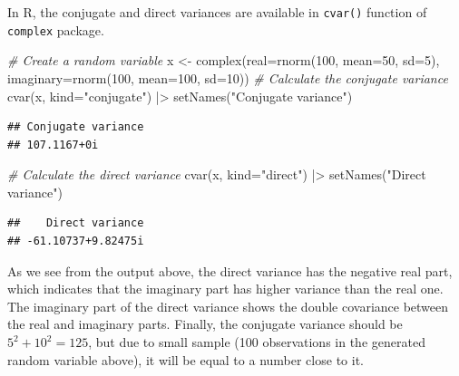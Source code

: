 \documentclass[
]{book}
\newenvironment{Shaded}{\begin{snugshade}}{\end{snugshade}}
\newcommand{\AttributeTok}[1]{\textcolor[rgb]{0.77,0.63,0.00}{#1}}
\newcommand{\CommentTok}[1]{\textcolor[rgb]{0.56,0.35,0.01}{\textit{#1}}}
\newcommand{\DecValTok}[1]{\textcolor[rgb]{0.00,0.00,0.81}{#1}}
\newcommand{\FunctionTok}[1]{\textcolor[rgb]{0.00,0.00,0.00}{#1}}
\newcommand{\NormalTok}[1]{#1}
\newcommand{\OtherTok}[1]{\textcolor[rgb]{0.56,0.35,0.01}{#1}}
\newcommand{\SpecialCharTok}[1]{\textcolor[rgb]{0.00,0.00,0.00}{#1}}
\newcommand{\StringTok}[1]{\textcolor[rgb]{0.31,0.60,0.02}{#1}}
\begin{document}
In R, the conjugate and direct variances are available in \texttt{cvar()} function of \texttt{complex} package.

\begin{Shaded}
\begin{Highlighting}[]
\CommentTok{\# Create a random variable}
\NormalTok{x }\OtherTok{\textless{}{-}} \FunctionTok{complex}\NormalTok{(}\AttributeTok{real=}\FunctionTok{rnorm}\NormalTok{(}\DecValTok{100}\NormalTok{, }\AttributeTok{mean=}\DecValTok{50}\NormalTok{, }\AttributeTok{sd=}\DecValTok{5}\NormalTok{),}
             \AttributeTok{imaginary=}\FunctionTok{rnorm}\NormalTok{(}\DecValTok{100}\NormalTok{, }\AttributeTok{mean=}\DecValTok{100}\NormalTok{, }\AttributeTok{sd=}\DecValTok{10}\NormalTok{))}
\CommentTok{\# Calculate the conjugate variance}
\FunctionTok{cvar}\NormalTok{(x, }\AttributeTok{kind=}\StringTok{"conjugate"}\NormalTok{) }\SpecialCharTok{|\textgreater{}}
    \FunctionTok{setNames}\NormalTok{(}\StringTok{"Conjugate variance"}\NormalTok{)}
\end{Highlighting}
\end{Shaded}

\begin{verbatim}
## Conjugate variance 
## 107.1167+0i
\end{verbatim}

\begin{Shaded}
\begin{Highlighting}[]
\CommentTok{\# Calculate the direct variance}
\FunctionTok{cvar}\NormalTok{(x, }\AttributeTok{kind=}\StringTok{"direct"}\NormalTok{) }\SpecialCharTok{|\textgreater{}}
    \FunctionTok{setNames}\NormalTok{(}\StringTok{"Direct variance"}\NormalTok{)}
\end{Highlighting}
\end{Shaded}

\begin{verbatim}
##    Direct variance 
## -61.10737+9.82475i
\end{verbatim}

As we see from the output above, the direct variance has the negative real part, which indicates that the imaginary part has higher variance than the real one. The imaginary part of the direct variance shows the double covariance between the real and imaginary parts. Finally, the conjugate variance should be \(5^2 + 10^2 = 125\), but due to small sample (100 observations in the generated random variable above), it will be equal to a number close to it.
\end{document}
